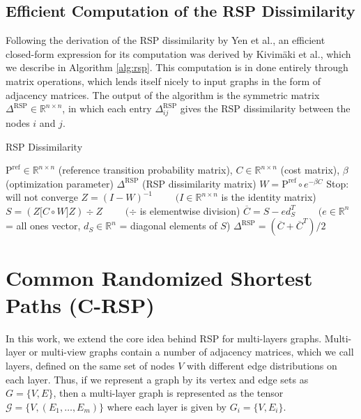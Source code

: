 \subsection{Efficient Computation of the RSP Dissimilarity}

Following the derivation of the RSP dissimilarity by Yen et al.\cite{Yen2008}, an efficient closed-form expression for its computation was derived by Kivim\"aki et al.\cite{Kivimaki2014}, which we describe in Algorithm \ref{alg:rsp}. This computation is in done entirely through matrix operations, which lends itself nicely to input graphs in the form of adjacency matrices. The output of the algorithm is the symmetric matrix $\Delta^{\mathrm{RSP}} \in \mathbb{R}^{n\times n}$, in which each entry $\Delta^{\mathrm{RSP}}_{ij}$ gives the RSP dissimilarity between the nodes $i$ and $j$.  

\begin{algorithm}
    \caption{RSP Dissimilarity}
    \label{alg:rsp}

    \begin{algorithmic}
	\REQUIRE $\mathrm{P^{ref}} \in \mathbb{R}^{n \times n}$ (reference transition probability matrix), $C\in \mathbb{R}^{n \times n}$ (cost matrix), $\beta$ (optimization parameter)
	\ENSURE $\Delta^{\mathrm{RSP}}$ (RSP dissimilarity matrix)
	\STATE $ W = \mathrm{P^{ref}} \circ e^{ -\beta C}$
	\STATE Stop: will not converge
          \ENDIF	
	\STATE $Z = (I - W)^{-1}$   $\qquad (I \in \mathbb{R}^{n \times n}$ is the identity matrix)
	\STATE $S = (Z\lbrack C \circ W \rbrack Z) \div Z$   $\qquad (\div$ is elementwise division)
	\STATE $\overline{C} = S - ed_S^T$   $\qquad  (e \in \mathbb{R}^n$ = all ones vector, $d_S\in \mathbb{R}^n$ = diagonal
 elements of $S$)
	\STATE $\Delta^{\mathrm{RSP}} = (\overline{C} + \overline{C}^T)/2$
    \end{algorithmic}

\end{algorithm}

\section{Common Randomized Shortest Paths (C-RSP)}

In this work, we extend the core idea behind RSP for multi-layers graphs. Multi-layer or multi-view graphs contain a number of adjacency matrices, which we call layers, defined on the same set of nodes $V$ with different edge distributions on each layer. Thus, if we represent a graph by its vertex and edge sets as $G = \{V,E\}$, then a multi-layer graph is represented as the tensor $\mathcal{G} = \{V, (E_1, \ldots, E_m)\}$ where each layer is given by $G_i = \{V, E_i\}$.

